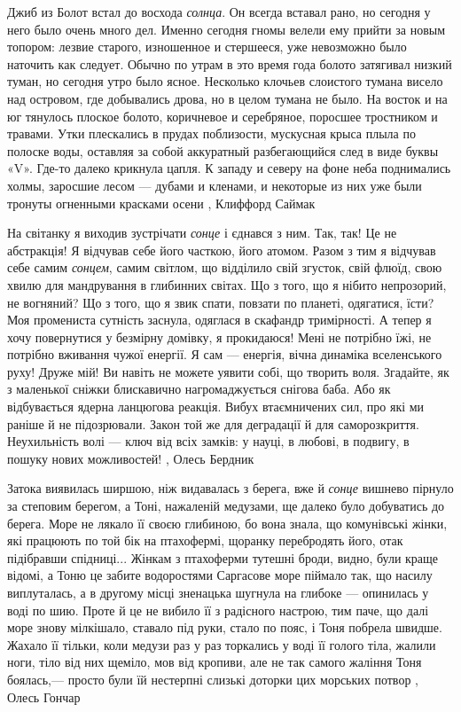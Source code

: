 Джиб из Болот встал до восхода \emph{солнца}. Он всегда вставал рано, но сегодня у
него было очень много дел. Именно сегодня гномы велели ему прийти за новым
топором: лезвие старого, изношенное и стершееся, уже невозможно было наточить
как следует.  Обычно по утрам в это время года болото затягивал низкий туман,
но сегодня утро было ясное. Несколько клочьев слоистого тумана висело над
островом, где добывались дрова, но в целом тумана не было. На восток и на юг
тянулось плоское болото, коричневое и серебряное, поросшее тростником и
травами. Утки плескались в прудах поблизости, мускусная крыса плыла по полоске
воды, оставляя за собой аккуратный разбегающийся след в виде буквы «V». Где-то
далеко крикнула цапля. К западу и северу на фоне неба поднимались холмы,
заросшие лесом — дубами и кленами, и некоторые из них уже были тронуты
огненными красками осени
, Клиффорд Саймак

На світанку я виходив зустрічати \emph{сонце} і єднався з ним. Так, так! Це не
абстракція! Я відчував себе його часткою, його атомом. Разом з тим я відчував
себе самим \emph{сонцем}, самим світлом, що відділило свій згусток, свій флюїд,
свою хвилю для мандрування в глибинних світах. Що з того, що я нібито
непрозорий, не вогняний? Що з того, що я звик спати, повзати по планеті,
одягатися, їсти? Моя промениста сутність заснула, одяглася в скафандр
тримірності. А тепер я хочу повернутися у безмірну домівку, я прокидаюся! Мені
не потрібно їжі, не потрібно вживання чужої енергії. Я сам — енергія, вічна
динаміка вселенського руху!  Друже мій! Ви навіть не можете уявити собі, що
творить воля. Згадайте, як з маленької сніжки блискавично нагромаджується
снігова баба. Або як відбувається ядерна ланцюгова реакція. Вибух втаємничених
сил, про які ми раніше й не підозрювали. Закон той же для деградації й для
саморозкриття. Неухильність волі — ключ від всіх замків: у науці, в любові, в
подвигу, в пошуку нових можливостей!
, Олесь Бердник

Затока виявилась ширшою, ніж видавалась з берега, вже й \emph{сонце} вишнево пірнуло
за степовим берегом, а Тоні, нажаленій медузами, ще далеко було добуватись до
берега. Море не лякало її своєю глибиною, бо вона знала, що комунівські жінки,
які працюють по той бік на птахофермі, щоранку перебродять його, отак
підібравши спідниці... Жінкам з птахоферми тутешні броди, видно, були краще
відомі, а Тоню це забите водоростями Саргасове море піймало так, що насилу
виплуталась, а в другому місці зненацька шугнула на глибоке — опинилась у воді
по шию. Проте й це не вибило її з радісного настрою, тим паче, що далі море
знову мілкішало, ставало під руки, стало по пояс, і Тоня побрела швидше. Жахало
її тільки, коли медузи раз у раз торкались у воді її голого тіла, жалили ноги,
тіло від них щеміло, мов від кропиви, але не так самого жаління Тоня боялась,—
просто були їй нестерпні слизькі доторки цих морських потвор
, Олесь Гончар
